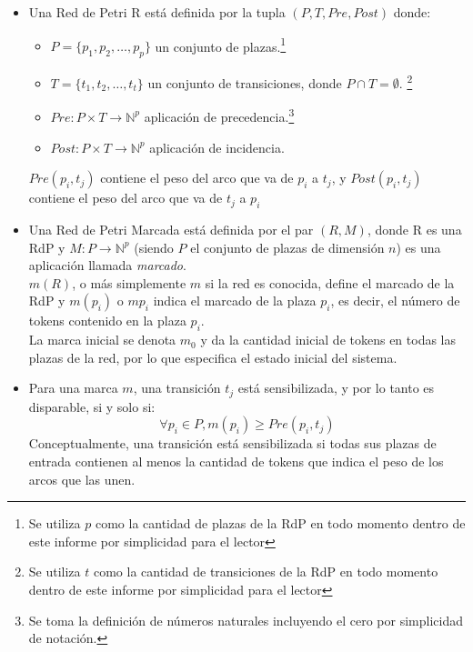 \begin{itemize}
  \item [\underline{Definición 1}:] Una Red de Petri R está definida por la
  tupla $(P, T, Pre, Post)$ donde:
  \begin{itemize}
    \item $ P = \{ p_1, p_2, \ldots, p_p \} $ un conjunto de plazas.\footnote{Se
    utiliza $p$ como la cantidad de plazas de la RdP en todo momento dentro de este informe por simplicidad para el lector}
    \item $ T = \{ t_1, t_2, \ldots, t_t \} $ un conjunto de transiciones, donde
    $ P \cap T = \emptyset $. \footnote{Se utiliza $t$ como la cantidad de
    transiciones de la RdP en todo momento dentro de este informe por
    simplicidad para el lector}
    \item $ Pre: P \times T \rightarrow \mathbb{N}^{p} $ aplicación de
    precedencia.\footnote{Se toma la definición de números naturales incluyendo
    el cero por simplicidad de notación.}
    \item $ Post: P \times T \rightarrow \mathbb{N}^{p} $ aplicación de
    incidencia.
  \end{itemize}
  $ Pre (p_i, t_j) $ contiene el peso del arco que va de $ p_i $ a $ t_j $, y
  $ Post (p_i, t_j) $ contiene el peso del arco que va de $ t_j $ a $ p_i $

  \item [\underline{Definición 2}:] Una Red de Petri Marcada está
  definida por el par $(R, M)$, donde R es una RdP y $ M : P \rightarrow
  \mathbb{N}^{p} $ (siendo $P$ el conjunto de plazas de dimensión $n$) es una aplicación llamada \textit{marcado}.\\
  $m(R)$, o más simplemente $m$ si la red es conocida, define el marcado de la
  RdP y $m(p_{i})$ o $mp_{i}$ indica el marcado de la plaza $p_{i}$, es decir,
  el número de tokens contenido en la plaza $p_{i}$.\\
  La marca inicial se denota $m_{0}$ y da la cantidad inicial de tokens en todas
  las plazas de la red, por lo que especifica el estado inicial del sistema.
  
  \item [\underline{Definición 3}:] Para una marca $m$, una transición $t_{j}$
  está sensibilizada, y por lo tanto es disparable, si y solo si:\\
  $$ \forall p_{i} \in P, m(p_i) \geq Pre(p_{i}, t_{j}) $$
  Conceptualmente, una transición está sensibilizada si todas sus plazas de
  entrada contienen al menos la cantidad de tokens que indica el peso de los
  arcos que las unen.


\end{itemize}

